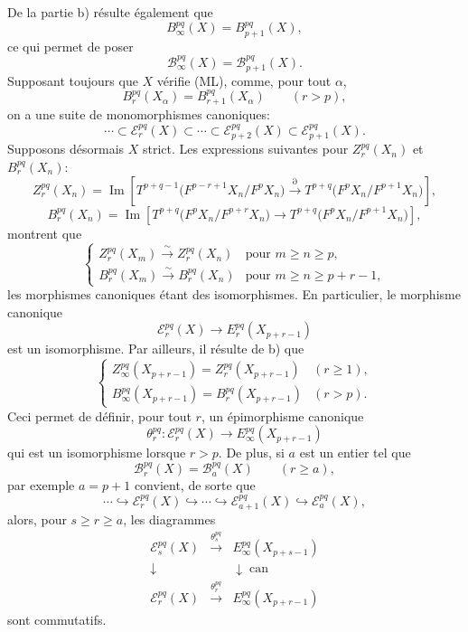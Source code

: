 \documentclass[11pt]{article}
\providecommand{\Im}{\operatorname{Im}}
\renewcommand{\Im}{\operatorname{Im}}
\providecommand{\Im}{\operatorname{Im}}
\providecommand{\can}{\operatorname{can}}
\begin{document}
De la partie b) résulte également que
\[
B_\infty^{pq}(X)=B_{p+1}^{pq}(X),
\]
ce qui permet de poser
\[
\mathcal B_\infty^{pq}(X)=\mathcal B_{p+1}^{pq}(X).
\]
Supposant toujours que \(X\) vérifie (ML), comme, pour tout \(\alpha\),
\[
B_r^{pq}(X_\alpha)=B_{r+1}^{pq}(X_\alpha)\qquad(r>p),
\]
on a une suite de monomorphismes canoniques:
\begin{equation}
\cdots\subset\mathcal E_r^{pq}(X)\subset\cdots\subset\mathcal E_{p+2}^{pq}(X)\subset\mathcal E_{p+1}^{pq}(X).
\tag{S}
\end{equation}
Supposons désormais \(X\) strict. Les expressions suivantes pour \(Z_r^{pq}(X_n)\) et \(B_r^{pq}(X_n)\):
\[
Z_r^{pq}(X_n)=
\Im\!\left[
T^{p+q-1}\bigl(F^{p-r+1}X_n/F^pX_n\bigr)
\xrightarrow{\partial}
T^{p+q}\bigl(F^pX_n/F^{p+1}X_n\bigr)
\right],
\]
\[
B_r^{pq}(X_n)=
\Im\!\left[
T^{p+q}\bigl(F^pX_n/F^{p+r}X_n\bigr)
\longrightarrow
T^{p+q}\bigl(F^pX_n/F^{p+1}X_n\bigr)
\right],
\]
montrent que
\begin{equation}
\left\{
\begin{array}{ll}
Z_r^{pq}(X_m)\xrightarrow{\sim}Z_r^{pq}(X_n)&\text{pour }m\ge n\ge p,\\[3pt]
B_r^{pq}(X_m)\xrightarrow{\sim}B_r^{pq}(X_n)&\text{pour }m\ge n\ge p+r-1,
\end{array}
\right.
\tag{\(d_1\)}
\end{equation}
les morphismes canoniques étant des isomorphismes. En particulier, le morphisme canonique
\[
\mathcal E_r^{pq}(X)\longrightarrow E_r^{pq}(X_{p+r-1})
\]
est un isomorphisme. Par ailleurs, il résulte de b) que
\begin{equation}
\left\{
\begin{array}{ll}
Z_\infty^{pq}(X_{p+r-1})=Z_r^{pq}(X_{p+r-1})&(r\ge1),\\[3pt]
B_\infty^{pq}(X_{p+r-1})=B_r^{pq}(X_{p+r-1})&(r>p).
\end{array}
\right.
\tag{\(d_2\)}
\end{equation}
Ceci permet de définir, pour tout \(r\), un épimorphisme canonique
\[
\theta_r^{pq}:\mathcal E_r^{pq}(X)\longrightarrow E_\infty^{pq}(X_{p+r-1})
\]
qui est un isomorphisme lorsque \(r>p\). De plus, si \(a\) est un entier tel que
\[
\mathcal B_r^{pq}(X)=\mathcal B_a^{pq}(X)\qquad(r\ge a),
\]
par exemple \(a=p+1\) convient, de sorte que
\begin{equation}
\cdots\hookrightarrow\mathcal E_r^{pq}(X)\hookrightarrow\cdots\hookrightarrow
\mathcal E_{a+1}^{pq}(X)\hookrightarrow\mathcal E_a^{pq}(X),
\tag{S bis}
\end{equation}
alors, pour \(s\ge r\ge a\), les diagrammes
\begin{equation}
\begin{array}{ccc}
\mathcal E_s^{pq}(X)&\xrightarrow{\theta_s^{pq}}&E_\infty^{pq}(X_{p+s-1})\\
\downarrow&&\downarrow\can\\
\mathcal E_r^{pq}(X)&\xrightarrow{\theta_r^{pq}}&E_\infty^{pq}(X_{p+r-1})
\end{array}
\tag{\(d_3\)}
\end{equation}
sont commutatifs.
\end{document}
